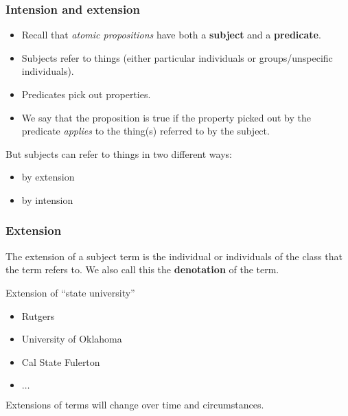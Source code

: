 \documentclass[10pt,letterpaper,xcolor=dvipsnames,handout]{beamer}
\begin{document}
\begin{frame}
  \frametitle{Intension and extension}
  
  \begin{itemize}
    \item Recall that \textit{atomic propositions} have both a \textbf{subject} and a \textbf{predicate}.
    \item Subjects refer to things (either particular individuals or groups/unspecific individuals).
    \item Predicates pick out properties.
    \item We say that the proposition is true if the property picked out by the predicate \textit{applies} to the thing(s) referred to by the subject.
  \end{itemize}
  
  But subjects can refer to things in two different ways:
  \begin{itemize}
    \item by extension
    \item by intension
  \end{itemize}
  
\end{frame}

\begin{frame}
  \frametitle{Extension}
  
  The extension of a subject term is the individual or individuals of the class that the term refers to. We also call this the \textbf{denotation} of the term.
  
  \begin{block}{Extension of ``state university''}
    \begin{itemize}
      \item Rutgers
      \item University of Oklahoma
      \item Cal State Fulerton
      \item $\ldots$
    \end{itemize}
  \end{block}
  
  Extensions of terms will change over time and circumstances.
\end{frame}
\end{document}
